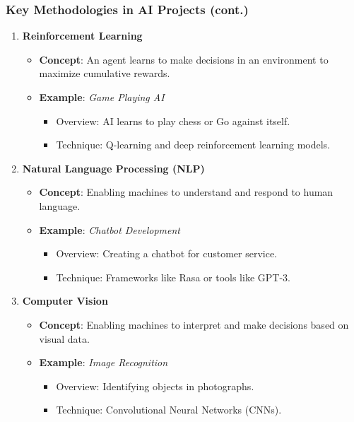 \documentclass{beamer}
\begin{document}
\begin{frame}[fragile]
    \frametitle{Key Methodologies in AI Projects (cont.)}
    \begin{enumerate}[resume]
        \item \textbf{Reinforcement Learning}
            \begin{itemize}
                \item \textbf{Concept}: An agent learns to make decisions in an environment to maximize cumulative rewards.
                \item \textbf{Example}: \textit{Game Playing AI}
                    \begin{itemize}
                        \item Overview: AI learns to play chess or Go against itself.
                        \item Technique: Q-learning and deep reinforcement learning models.
                    \end{itemize}
            \end{itemize}
        \item \textbf{Natural Language Processing (NLP)}
            \begin{itemize}
                \item \textbf{Concept}: Enabling machines to understand and respond to human language.
                \item \textbf{Example}: \textit{Chatbot Development}
                    \begin{itemize}
                        \item Overview: Creating a chatbot for customer service.
                        \item Technique: Frameworks like Rasa or tools like GPT-3.
                    \end{itemize}
            \end{itemize}
        \item \textbf{Computer Vision}
            \begin{itemize}
                \item \textbf{Concept}: Enabling machines to interpret and make decisions based on visual data.
                \item \textbf{Example}: \textit{Image Recognition}
                    \begin{itemize}
                        \item Overview: Identifying objects in photographs.
                        \item Technique: Convolutional Neural Networks (CNNs).
                    \end{itemize}
            \end{itemize}
    \end{enumerate}
\end{frame}
\end{document}
